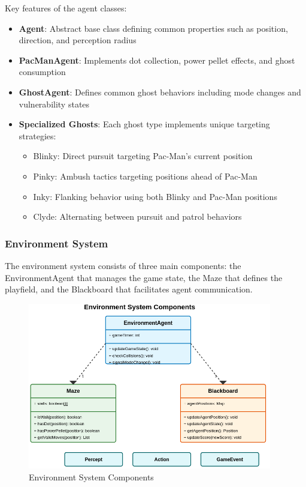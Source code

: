 \documentclass[a4paper, 11pt]{article}
\begin{document}
Key features of the agent classes:
\begin{itemize}
    \item \textbf{Agent}: Abstract base class defining common properties such as position, direction, and perception radius
    \item \textbf{PacManAgent}: Implements dot collection, power pellet effects, and ghost consumption
    \item \textbf{GhostAgent}: Defines common ghost behaviors including mode changes and vulnerability states
    \item \textbf{Specialized Ghosts}: Each ghost type implements unique targeting strategies:
    \begin{itemize}
        \item Blinky: Direct pursuit targeting Pac-Man's current position
        \item Pinky: Ambush tactics targeting positions ahead of Pac-Man
        \item Inky: Flanking behavior using both Blinky and Pac-Man positions
        \item Clyde: Alternating between pursuit and patrol behaviors
    \end{itemize}
\end{itemize}

\subsubsection{Environment System}
The environment system consists of three main components: the EnvironmentAgent that manages the game state, the Maze that defines the playfield, and the Blackboard that facilitates agent communication.

\begin{figure}[h]
\centering
\includegraphics[width=0.95\textwidth]{environment-class-diagram.png}
\caption{Environment System Components}
\end{figure}
\end{document}
